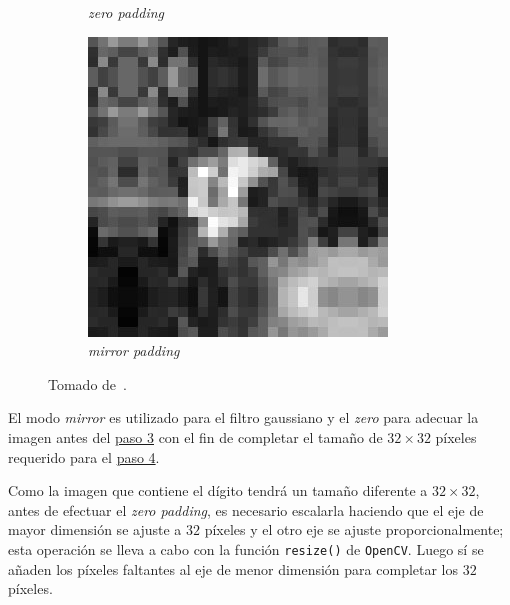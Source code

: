 \begin{figure}[h!]
\begin{subfigure}[t]{0.3\textwidth}
        \caption{\emph{zero padding}}
    \end{subfigure}
    \hfill
    \begin{subfigure}[t]{0.3\textwidth}
        \includegraphics[width=\textwidth]{3_Reconocimiento/Figs/mirror_padding}
        \caption{\emph{mirror padding}}
    \end{subfigure}
    \caption*{\footnotesize Tomado de~\citep{Richard2011}.}
\end{figure}

El modo \emph{mirror} es utilizado para el filtro gaussiano y el \emph{zero} para adecuar la imagen antes del \hyperref[sec:segmentation]{paso 3} con el fin de completar el tamaño de $32 \times 32$ píxeles requerido para el \hyperref[sec:sift_descriptor]{paso 4}.

Como la imagen que contiene el dígito tendrá un tamaño diferente a $32 \times 32$, antes de efectuar el \emph{zero padding}, es necesario escalarla haciendo que el eje de mayor dimensión se ajuste a $32$ píxeles y el otro eje se ajuste proporcionalmente;
esta operación se lleva a cabo con la función \texttt{\small resize()} de \texttt{\small OpenCV}.
Luego sí se añaden los píxeles faltantes al eje de menor dimensión para completar los $32$ píxeles.
\vfill

